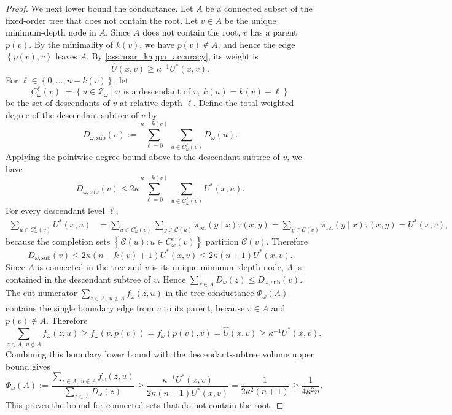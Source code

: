 \documentclass{article}
\numberwithin{theorem}{section}
\numberwithin{proposition}{section}
\numberwithin{corollary}{section}
\numberwithin{lemma}{section}
\numberwithin{conjecture}{section}
\numberwithin{remark}{section}
\numberwithin{definition}{section}
\numberwithin{assumption}{section}
\numberwithin{example}{section}
\newcommand{\calC}{{\mathcal{C}}}
\newcommand{\calZ}{{\mathcal{Z}}}
\newcommand{\mbra}[1]{\left\{#1\right\}}
\providecommand{\base}{\pi_{\mathrm{ref}}}
\begin{document}
\begin{proof}
We next lower bound the conductance. Let $A$ be a connected subset of the fixed-order tree that does not contain the root. Let $v\in A$ be the unique minimum-depth node in $A$. Since $A$ does not contain the root, $v$ has a parent $p(v)$. By the minimality of $k(v)$, we have $p(v)\notin A$, and hence the edge $\mbra{p(v),v}$ leaves $A$. By \cref{ass:aoar_kappa_accuracy}, its weight is
\begin{equation*}
    \widehat U(x,v) \ge \kappa^{-1}U^*(x,v).
\end{equation*}
For $\ell \in \mbra{0,\dots,n-k(v)}$, let
\begin{equation*}
    C_\omega^\ell(v):=\mbra{u\in\calZ_\omega \mid u \text{ is a descendant of } v,\ k(u)=k(v)+\ell}
\end{equation*}
be the set of descendants of $v$ at relative depth $\ell$. Define the total weighted degree of the descendant subtree of $v$ by
\begin{equation*}
    D_{\omega,\mathrm{sub}}(v):=\sum_{\ell=0}^{n-k(v)} \sum_{u\in C_\omega^\ell(v)} D_\omega(u).
\end{equation*}
Applying the pointwise degree bound above to the descendant subtree of $v$, we have
\begin{equation*}
    D_{\omega,\mathrm{sub}}(v)\le 2\kappa \sum_{\ell=0}^{n-k(v)} \sum_{u\in C_\omega^\ell(v)} U^*(x,u).
\end{equation*}
For every descendant level $\ell$,
\begin{align*}
    \sum_{u\in C_\omega^\ell(v)}U^*(x,u) &=
    \sum_{u\in C_\omega^\ell(v)}\sum_{y\in\calC(u)}\base(y\mid x)\tau(x,y) = \sum_{y\in\calC(v)}\base(y\mid x)\tau(x,y) = U^*(x,v),
\end{align*}
because the completion sets $\mbra{\calC(u):u\in C_\omega^\ell(v)}$ partition $\calC(v)$. Therefore
\begin{equation*}
    D_{\omega,\mathrm{sub}}(v)\le 2\kappa(n-k(v)+1)U^*(x,v)\le 2\kappa(n+1)U^*(x,v).
\end{equation*}
Since $A$ is connected in the tree and $v$ is its unique minimum-depth node, $A$ is contained in the descendant subtree of $v$. Hence $\sum_{z\in A}D_\omega(z)\le D_{\omega,\mathrm{sub}}(v)$. The cut numerator $\sum_{z\in A,\ u\notin A}f_\omega(z,u)$ in the tree conductance $\Phi_\omega(A)$ contains the single boundary edge from $v$ to its parent, because $v\in A$ and $p(v)\notin A$. Therefore
\begin{equation*}
    \sum_{z\in A,\ u\notin A}f_\omega(z,u)\ge f_\omega(v,p(v))=f_\omega(p(v),v)=\widehat U(x,v)\ge \kappa^{-1}U^*(x,v).
\end{equation*}
Combining this boundary lower bound with the descendant-subtree volume upper bound gives
\begin{equation*}
    \Phi_\omega(A):= \frac{\sum_{z\in A,\ u\notin A}f_\omega(z,u)}{\sum_{z\in A}D_\omega(z)} \ge \frac{\kappa^{-1}U^*(x,v)}{2\kappa(n+1)U^*(x,v)}=\frac{1}{2\kappa^2(n+1)}\ge \frac{1}{4\kappa^2 n}.
\end{equation*}
This proves the bound for connected sets that do not contain the root.


\end{proof}
\end{document}

